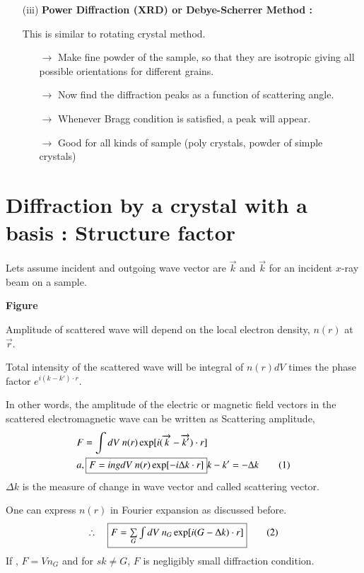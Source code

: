 \begin{itemize}
\item[(iii)] {\bf Power Diffraction (XRD) or Debye-Scherrer Method :}

This is similar to rotating crystal method.
\begin{itemize}
\item[$\to$] Make fine powder of the sample, so that they are isotropic giving all possible orientations for different grains.

\item[$\to$] Now find the diffraction peaks as a function of scattering angle.

\item[$\to$] Whenever Bragg condition is satisfied, a peak will appear.

\item[$\to$] Good for all kinds of sample (poly crystals, powder of simple crystals)
\end{itemize}
\end{itemize}

\section*{Diffraction by a crystal with a basis : Structure factor}

Lets assume incident and outgoing wave vector are $\overrightarrow{k}$ and $\overrightarrow{k}$ for an incident $x$-ray beam on a sample.
\begin{center}
{\bf Figure}
\end{center}

Amplitude of scattered wave will depend on the local electron density, $n(r)$ at $\overrightarrow{r}$.

Total intensity of the scattered wave will be integral of $n(r)dV$ times the phase factor $e^{i(k-k')\cdot r}$.

In other words, the amplitude of the electric or magnetic field vectors in the scattered electromagnetic wave can be written as Scattering amplitude,
\begin{align*}
& F=\int dV \ n(r)\exp [i(\overrightarrow{k}-\overrightarrow{k'})\cdot r]\\
& a, \fbox{$F=ing dV \ n(r) \exp [-i\Delta k\cdot r]$}k-k'=-\Delta k\tag{1}\label{lec14-eq1}
\end{align*}
$\Delta k$ is the measure of change in wave vector and called scattering vector.

One can express $n(r)$ in Fourier expansion as discussed before.
\begin{equation*}
\therefore\quad \fbox{$F=\sum\limits_{G}\int dV \ n_{G}\exp [i(G-\Delta k)\cdot r]$}\tag{2}\label{lec14-eq2}
\end{equation*}
If ,  $F=Vn_{G}$ and for $sk\neq G$, $F$ is negligibly small diffraction condition.

